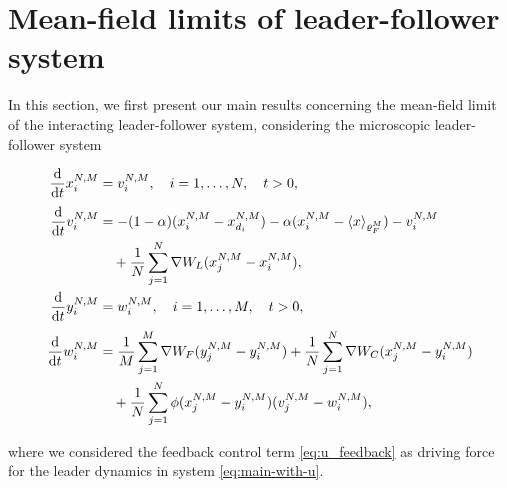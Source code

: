 \documentclass[10pt, reqno]{amsart}
\theoremstyle{definition}
\theoremstyle{remark}
\numberwithin{equation}{section}
\newcommand{\ddt}{\frac{\textnormal{d}}{\textnormal{d}t}}
\begin{document}





%
%
%
%
%
%

\section{Mean-field limits of leader-follower system}\label{sec:main_results}
In this section, we first present our main results concerning the mean-field limit of the interacting leader-follower system, considering the microscopic leader-follower system
\begin{mybox}
\begin{equation}\label{eq:mimi}
\begin{split}
    \ddt x_i^{N,M} &= v_i^{N,M}, \quad i = 1,\dots, N, \quad t > 0,\\[1mm]
    \ddt v_i^{N,M} &= - (1 - \alpha) (x_i^{N,M} - x_{d_i}^{N,M}) - \alpha (x_i^{N,M} - \langle x \rangle_{\varrho_F^M}) - v_i^{N,M} \cr
    &\quad + \frac{1}{N}\sum_{j=1}^N \nabla W_L (x_j^{N,M}-x_i^{N,M}) ,\\
    \ddt y_i^{N,M} &= w_i^{N,M},\quad i = 1,\dots, M, \quad t > 0,\\[1mm]
    \ddt w_i^{N,M} &= \frac{1}{M}\sum_{j=1}^M \nabla W_F(y_j^{N,M}-y_i^{N,M}) + \frac{1}{N}\sum_{j=1}^N \nabla W_C(x_j^{N,M} - y_i^{N,M}) \\
    &\quad + \frac{1}{N}\sum_{j=1}^N \phi(x_j^{N,M} - y_i^{N,M}) (v_j^{N,M} - w_i^{N,M}), 
\end{split}
\end{equation}
\end{mybox}
where we considered the feedback control term \eqref{eq:u_feedback} as driving force for the leader dynamics in system \eqref{eq:main-with-u}.
\end{document}
